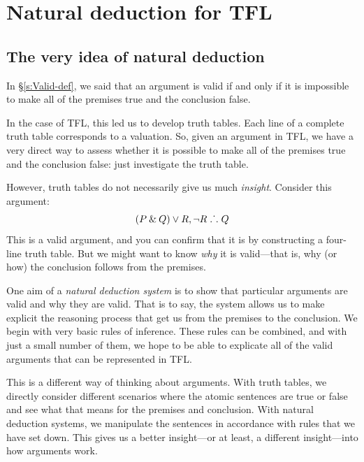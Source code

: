 \graphicspath{{figures--proofs/}}
\part{Natural deduction for TFL}
\label{ch.NDTFL}

\chapter{The very idea of natural deduction}\label{s:NDVeryIdea}

In \S\ref{s:Valid-def}, we said that an argument is valid if and only if it is impossible to make all of the premises true and the conclusion false. 

In the case of TFL, this led us to develop truth tables. Each line of a complete truth table corresponds to a valuation. So, given an argument in TFL, we have a very direct way to assess whether it is possible to make all of the premises true and the conclusion false: just investigate the truth table.

However, truth tables do not necessarily give us much \emph{insight}. Consider this argument:
$$(P \mathbin{\&} Q) \vee R, {\neg} R \mathrel{\ldotp\dot{}\,\ldotp} Q$$
This is a valid argument, and you can confirm that it is by constructing a four-line truth table. But we might want to know \textit{why} it is valid---that is, why (or how) the conclusion follows from the premises. 

One aim of a \emph{natural deduction system} is to show that particular arguments are valid and why they are valid. That is to say, the system allows us to make explicit the reasoning process that get us from the premises to the conclusion. We begin with very basic rules of inference. These rules can be combined, and with just a small number of them, we hope to be able to explicate all of the valid arguments that can be represented in TFL. 

This is a different way of thinking about arguments. With truth tables, we directly consider different scenarios where the atomic sentences are true or false and see what that means for the premises and conclusion. With natural deduction systems, we manipulate the sentences in accordance with rules that we have set down. This gives us a better insight---or at least, a different insight---into how arguments work.

